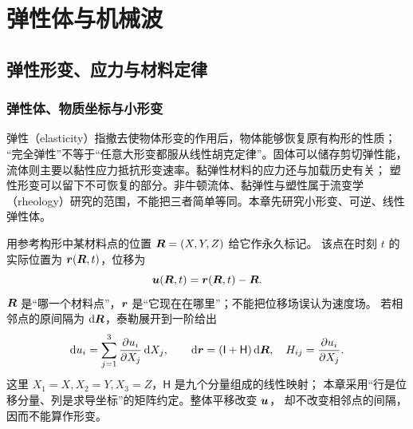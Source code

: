 \hypersetup{bookmarksdepth=3}
\begingroup
\renewcommand{\Needspace}[1]{\par\begingroup
\dimen0=#1\relax\vskip0pt plus\dimen0\penalty-100
\vskip0pt plus-\dimen0\vskip\dimen0\penalty9999\vskip-\dimen0
\vskip0pt\endgroup}
\chapter{弹性体与机械波}



\section{弹性形变、应力与材料定律}
\subsection{弹性体、物质坐标与小形变}

弹性（elasticity）指撤去使物体形变的作用后，物体能够恢复原有构形的性质；
“完全弹性”不等于“任意大形变都服从线性胡克定律”。固体可以储存剪切弹性能，
流体则主要以黏性应力抵抗形变速率。黏弹性材料的应力还与加载历史有关；
塑性形变可以留下不可恢复的部分。非牛顿流体、黏弹性与塑性属于流变学
（rheology）研究的范围，不能把三者简单等同。本章先研究小形变、可逆、线性弹性体。

用参考构形中某材料点的位置 $\bm{R}=(X,Y,Z)$ 给它作永久标记。
该点在时刻 $t$ 的实际位置为 $\bm{r}(\bm{R},t)$，位移为
\begin{equation}
 \vect u(\vect R,t)=\vect r(\vect R,t)-\vect R.
 \label{ch12:eq:displacement}
\end{equation}
$\bm{R}$ 是“哪一个材料点”，$\bm{r}$ 是“它现在在哪里”；不能把位移场误认为速度场。
若相邻点的原间隔为 $\mathop{}\!\mathrm d\bm{R}$，泰勒展开到一阶给出
\begin{equation}
 \dd u_i=\sum_{j=1}^{3}\frac{\partial u_i}{\partial X_j}\dd X_j,\qquad
 \dd\vect r=(\mathsf I+\mathsf H)\dd\vect R,\quad H_{ij}=\frac{\partial u_i}{\partial X_j}.
 \label{ch12:eq:gradient}
\end{equation}
这里 $X_1=X,X_2=Y,X_3=Z$，$\mathsf H$ 是九个分量组成的线性映射；
本章采用“行是位移分量、列是求导坐标”的矩阵约定。整体平移改变 $\bm{u}$，
却不改变相邻点的间隔，因而不能算作形变。

